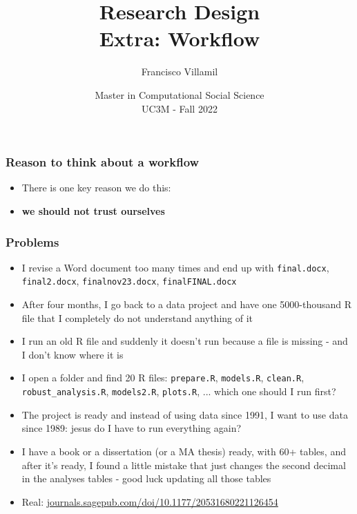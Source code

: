 \documentclass[utf8, xcolor=dvipsnames, handout]{beamer}
\title[]{Research Design\\Extra: Workflow}
\author[]{Francisco Villamil}
\date[]{Master in Computational Social Science\\UC3M - Fall 2022}
\begin{document}
\begin{frame}
  \titlepage
\end{frame}


\begin{frame}
\frametitle{Reason to think about a workflow}
\centering

\begin{itemize}
  \item There is one key reason we do this:
  \item[] \textbf{we should not trust ourselves}
\end{itemize}

\end{frame}

\begin{frame}
\frametitle{Problems}
\centering

\begin{itemize}[<+->] \small
{}
  \item<1> I revise a Word document too many times and end up with \texttt{final.docx}, \texttt{final2.docx}, \texttt{finalnov23.docx}, \texttt{finalFINAL.docx}
  \item<2> After four months, I go back to a data project and have one 5000-thousand R file that I completely do not understand anything of it
  \item<3> I run an old R file and suddenly it doesn't run because a file is missing - and I don't know where it is
  \item<4> I open a folder and find 20 R files: \texttt{prepare.R}, \texttt{models.R}, \texttt{clean.R}, \texttt{robust\_analysis.R}, \texttt{models2.R}, \texttt{plots.R}, ... which one should I run first?
  \item<5> The project is ready and instead of using data since 1991, I want to use data since 1989: jesus do I have to run everything again?
  \item<6> I have a book or a dissertation (or a MA thesis) ready, with 60+ tables, and after it's ready, I found a little mistake that just changes the second decimal in the analyses tables - good luck updating all those tables
  \item<7> Real: \href{https://journals.sagepub.com/doi/10.1177/20531680221126454}{journals.sagepub.com/doi/10.1177/20531680221126454}
\end{itemize}

\end{frame}
\end{document}
